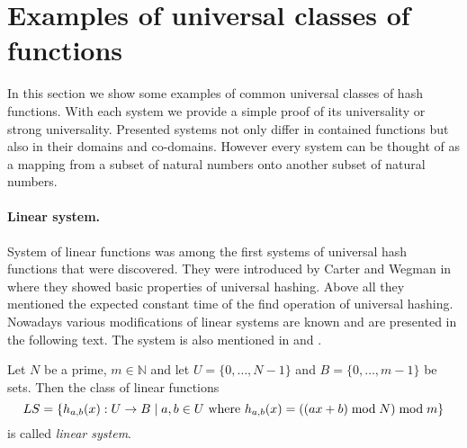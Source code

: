 \section{Examples of universal classes of functions}
In this section we show some examples of common universal classes of hash functions. With each system we provide a simple proof of its universality or strong universality. Presented systems not only differ in contained functions but also in their domains and co-domains. However every system can be thought of as a mapping from a subset of natural numbers onto another subset of natural numbers.

\paragraph{Linear system.}
System of linear functions was among the first systems of universal hash functions that were discovered. They were introduced by Carter and Wegman in \cite{DBLP:journals/jcss/CarterW79} where they showed basic properties of universal hashing. Above all they mentioned the expected constant time of the find operation of universal hashing. Nowadays various modifications of linear systems are known and are presented in the following text. The system is also mentioned in \cite{VK-skripta} and \cite{DBLP:books/sp/MehlhornS2008}.

\begin{definition}
\label{definition-linear-system}
Let $N$ be a prime, $m \in \mathbb{N}$ and let $U = \{0, \dots, N - 1 \}$ and $B = \{0, \dots, m - 1\}$ be sets. Then the class of linear functions 
\[ LS = \{h_{a, b}(x): U \rightarrow B \mid a, b \in U \text{ where } h_{a, b}(x) = ((ax + b) \bmod N) \bmod m \} \]
is called \emph{linear system}.
\end{definition}

